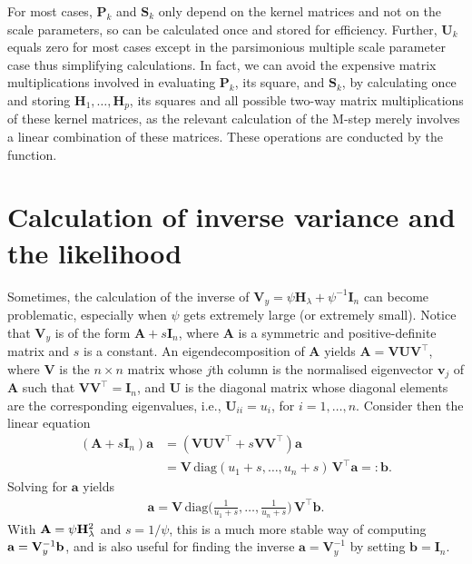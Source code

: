 \documentclass[english, 11pt]{article}
\begin{document}
For most cases, $\mathbf P_k$ and $\mathbf S_k$ only depend on the kernel matrices and not on the scale parameters, so can be calculated once and stored for efficiency. Further, $\mathbf U_k$ equals zero for most cases except in the parsimonious multiple scale parameter case thus simplifying calculations. In fact, we can avoid the expensive matrix multiplications involved in evaluating $\mathbf P_k$, its square, and $\mathbf S_k$, by calculating once and storing $\mathbf H_1, \dots, \mathbf H_p$, its squares and all possible two-way matrix multiplications of these kernel matrices, as the relevant calculation of the M-step merely involves a linear combination of these matrices. These operations are conducted by the  function.

\section{Calculation of inverse variance and the likelihood}
\label{apx:d}

Sometimes, the calculation of the inverse of $\mathbf V_y = \psi\mathbf H_\lambda + \psi^{-1}\mathbf I_n$ can become problematic, especially when $\psi$ gets extremely large (or extremely small). Notice that $\mathbf V_y$ is of the form $\mathbf A + s\mathbf I_n$, where $\mathbf A$ is a symmetric and positive-definite matrix and $s$ is a constant. An eigendecomposition of $\mathbf A$ yields $\mathbf A = \mathbf V \mathbf U \mathbf V^\top$, where $\mathbf V$ is the $n \times n$ matrix whose $j$th column is the normalised eigenvector $\mathbf v_j$ of $\mathbf A$ such that $\mathbf V\mathbf V^\top = \mathbf I_n$, and $\mathbf U$ is the diagonal matrix whose diagonal elements are the corresponding eigenvalues, i.e., $\mathbf U_{ii} = u_i$, for $i=1,\dots,n$. Consider then the linear equation
\begin{align*}
	(\mathbf A + s\mathbf I_n)\mathbf a &= (\mathbf V \mathbf U \mathbf V^\top + s  \mathbf V \mathbf V^\top)\mathbf a \\
	&= \mathbf V \, \text{diag}(u_1 \!+\! s, \dots, u_n \!+\! s) \, \mathbf V^\top \mathbf a =: \mathbf b.
\end{align*}
Solving for $\mathbf a$ yields
\begin{align}\label{eq:linsolve}
	\mathbf a = \mathbf V \, \text{diag} \Bigg( \frac{1}{u_1 \!+\! s}, \dots, \frac{1}{u_n \!+\! s} \Bigg) \, \mathbf V^\top \mathbf b.
\end{align}
With $\mathbf A = \psi\mathbf H_\lambda^2$ and $s=1/\psi$, this is a much more stable way of computing $\mathbf a = \mathbf{V}_y^{-1} \mathbf b$, and is also useful for finding the inverse $\mathbf a = \mathbf V_y^{-1}$ by setting $\mathbf b=\mathbf I_n$. %
\end{document}
